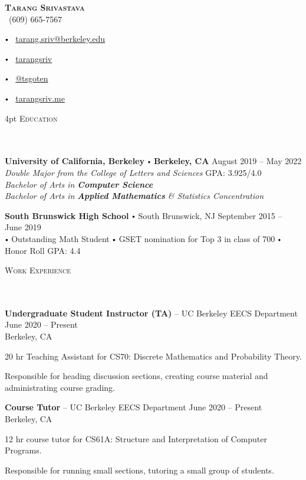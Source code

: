 \documentclass{article}
\newcommand{\contact}[3]{
\vspace*{3pt}
\begin{center}
{\LARGE \scshape {#1}}\\
\vspace{5pt}
#2 
\vspace{2pt}
#3
\end{center}
\vspace*{-8pt}
}
\newcommand{\header}[1]{{
\hspace*{-15pt}\vspace*{6pt} \textsc{#1}} \vspace*{-6pt} 
\lineunder
}
\newcommand{\lineunder}{
\vspace*{-8pt} \\ \hspace*{-18pt} 
\hrulefill \\
}
\newcommand{\school}[5]{\vspace*{2pt}%
\textbf{#1} \labelitemi #2 \hfill #3 \\ #4 \hfill #5
\vspace*{5pt}
}
\newcommand{\college}[7]{
\textbf{#1} \labelitemi \textbf{#2} \hfill #3 \\ #4 \hfill #7 \\ #5 \\ #6 \vspace*{5pt}
}
\newcommand{\employer}[4]{{
\vspace*{2pt}%
\textbf{#1} #2 \hfill #3\\ #4 \vspace*{2pt}}
}
\renewcommand{\labelitemi}{
$\vcenter{\hbox{\tiny$\bullet$}}$\hspace*{3pt}
}
\renewcommand{\labelitemii}{
$\vcenter{\hbox{\tiny$\bullet$}}$\hspace*{-3pt}
}
\newenvironment{bullet-list-minor}{
\begin{list}{\labelitemii}{\setlength\leftmargin{15pt} 
\topsep 0pt \itemsep -2pt}}{\vspace*{4pt}\end{list}
}
\begin{document}
\small
\smallskip
\vspace*{-44pt}

\contact{\textbf{Tarang Srivastava}}
{\faPhone\ (609) 665-7567 
\labelitemi \faEnvelope\ \href{mailto:tarang.sriv@berkeley.edu}{tarang.sriv@berkeley.edu}
\labelitemi \faLinkedin\ \href{https://www.linkedin.com/in/tarangsriv/}{tarangsriv}
\labelitemi \faGithub\ \href{https://github.com/tsgoten}{@tsgoten}%
\labelitemi \faLink\ \href{http://tarangsriv.me}{tarangsriv.me}
}

\vspace{4pt}
\header{Education}
    \college{University of California, Berkeley}{Berkeley, CA}{August 2019 -- May 2022}
    {\textit{Double Major from the College of Letters and Sciences}}
    {\textit{Bachelor of Arts in \textbf{Computer Science}}}
    {\textit{Bachelor of Arts in \textbf{Applied Mathematics} \& Statistics Concentration}}
    {GPA: 3.925/4.0}

    \school{South Brunswick High School}{South Brunswick, NJ}{September 2015 -- June 2019}
    {\labelitemi Outstanding Math Student \labelitemi GSET nomination for Top 3 in class of 700 \labelitemi Honor Roll}
    {GPA: 4.4}

\vspace*{4pt}%
\header{Work Experience}

    \employer{Undergraduate Student Instructor (TA)}
    {-- UC Berkeley EECS Department}{June 2020 -- Present}{Berkeley, CA}
	\begin{bullet-list-minor}
	\item 20 hr Teaching Assistant for CS70: Discrete Mathematics and Probability Theory. 
	\item Responsible for heading discussion sections, creating course material and administrating course grading.  
    \end{bullet-list-minor}

    \employer{Course Tutor}
    {-- UC Berkeley EECS Department}{June 2020 -- Present}{Berkeley, CA}
	\begin{bullet-list-minor}
    \item 12 hr course tutor for CS61A: Structure and Interpretation of Computer Programs. 
    \item Responsible for running small sections, tutoring a small group of students.
    \end{bullet-list-minor}

\end{document}
